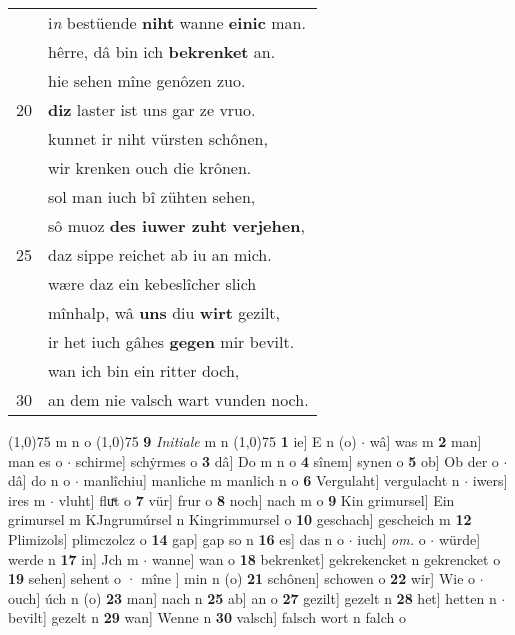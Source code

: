 \documentclass[8pt,a4paper,notitlepage]{article}
\begin{document}
\begin{table}[ht]
\begin{minipage}[t]{0.5\linewidth}
\begin{tabular}{rl}
 & i\textit{n} bestüende \textbf{niht} wanne \textbf{einic} man.\\ 
 & hêrre, dâ bin ich \textbf{bekrenket} an.\\ 
 & hie sehen mîne genôzen zuo.\\ 
20 & \textbf{diz} laster ist uns gar ze vruo.\\ 
 & kunnet ir niht vürsten schônen,\\ 
 & wir krenken ouch die krônen.\\ 
 & sol man iuch bî zühten sehen,\\ 
 & sô muoz \textbf{des iuwer zuht} \textbf{verjehen},\\ 
25 & daz sippe reichet ab iu an mich.\\ 
 & wære daz ein kebeslîcher slich\\ 
 & mînhalp, wâ \textbf{uns} diu \textbf{wirt} gezilt,\\ 
 & ir het iuch gâhes \textbf{gegen} mir bevilt.\\ 
 & wan ich bin ein ritter doch,\\ 
30 & an dem nie valsch wart vunden noch.\\ 
\end{tabular}
\scriptsize
\line(1,0){75} \newline
m n o \newline
\line(1,0){75} \newline
\textbf{9} \textit{Initiale} m n  \newline
\line(1,0){75} \newline
\textbf{1} ie] E n (o)  $\cdot$ wâ] was m \textbf{2} man] man es o  $\cdot$ schirme] schẏrmes o \textbf{3} dâ] Do m n o \textbf{4} sînem] synen o \textbf{5} ob] Ob der o  $\cdot$ dâ] do n o  $\cdot$ manlîchiu] manliche m manlich n o \textbf{6} Vergulaht] vergulacht n  $\cdot$ iwers] ires m  $\cdot$ vluht] fluͯt o \textbf{7} vür] frur o \textbf{8} noch] nach m o \textbf{9} Kin grimursel] Ein grimursel m KJngrumúrsel n Kingrimmursel o \textbf{10} geschach] gescheich m \textbf{12} Plimizols] plimczolcz o \textbf{14} gap] gap so n \textbf{16} es] das n o  $\cdot$ iuch] \textit{om.} o  $\cdot$ würde] werde n \textbf{17} in] Jch m  $\cdot$ wanne] wan o \textbf{18} bekrenket] gekrekencket n gekrencket o \textbf{19} sehen] sehent o · mîne ] min n (o) \textbf{21} schônen] schowen o \textbf{22} wir] Wie o  $\cdot$ ouch] úch n (o) \textbf{23} man] nach n \textbf{25} ab] an o \textbf{27} gezilt] gezelt n \textbf{28} het] hetten n  $\cdot$ bevilt] gezelt n \textbf{29} wan] Wenne n \textbf{30} valsch] falsch wort n falch o \newline
\end{minipage}
\end{table}
\end{document}
